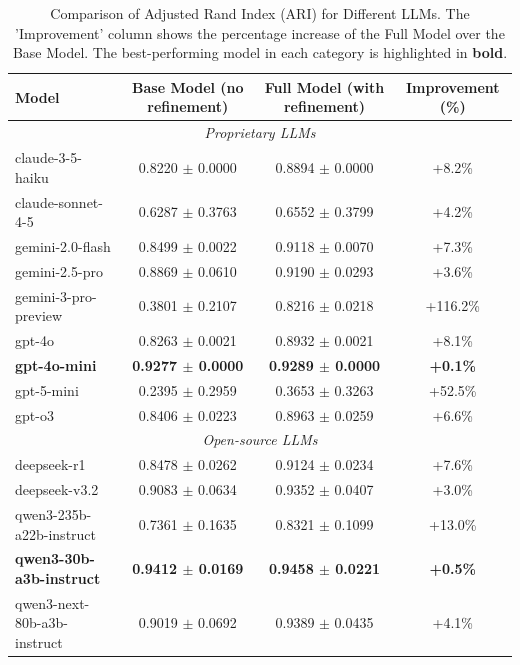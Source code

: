 
\begin{table}[htbp]
\centering
\caption{Comparison of Adjusted Rand Index (ARI) for Different LLMs. The 'Improvement' column shows the percentage increase of the Full Model over the Base Model. The best-performing model in each category is highlighted in \textbf{bold}.}
\label{tab:ari_comparison_enhanced}
\begin{tabular}{lccc}
\toprule
\textbf{Model} & \textbf{Base Model (no refinement)} & \textbf{Full Model (with refinement)} & \textbf{Improvement (\%)} \\
\midrule
\multicolumn{4}{c}{\textit{Proprietary LLMs}} \\
\midrule
claude-3-5-haiku & 0.8220 $\pm$ 0.0000 & 0.8894 $\pm$ 0.0000 & +8.2\% \\
claude-sonnet-4-5 & 0.6287 $\pm$ 0.3763 & 0.6552 $\pm$ 0.3799 & +4.2\% \\
gemini-2.0-flash & 0.8499 $\pm$ 0.0022 & 0.9118 $\pm$ 0.0070 & +7.3\% \\
gemini-2.5-pro & 0.8869 $\pm$ 0.0610 & 0.9190 $\pm$ 0.0293 & +3.6\% \\
gemini-3-pro-preview & 0.3801 $\pm$ 0.2107 & 0.8216 $\pm$ 0.0218 & +116.2\% \\
gpt-4o & 0.8263 $\pm$ 0.0021 & 0.8932 $\pm$ 0.0021 & +8.1\% \\
\textbf{gpt-4o-mini} & \textbf{0.9277 $\pm$ 0.0000} & \textbf{0.9289 $\pm$ 0.0000} & \textbf{+0.1\%} \\
gpt-5-mini & 0.2395 $\pm$ 0.2959 & 0.3653 $\pm$ 0.3263 & +52.5\% \\
gpt-o3 & 0.8406 $\pm$ 0.0223 & 0.8963 $\pm$ 0.0259 & +6.6\% \\
\midrule
\multicolumn{4}{c}{\textit{Open-source LLMs}} \\
\midrule
deepseek-r1 & 0.8478 $\pm$ 0.0262 & 0.9124 $\pm$ 0.0234 & +7.6\% \\
deepseek-v3.2 & 0.9083 $\pm$ 0.0634 & 0.9352 $\pm$ 0.0407 & +3.0\% \\
qwen3-235b-a22b-instruct & 0.7361 $\pm$ 0.1635 & 0.8321 $\pm$ 0.1099 & +13.0\% \\
\textbf{qwen3-30b-a3b-instruct} & \textbf{0.9412 $\pm$ 0.0169} & \textbf{0.9458 $\pm$ 0.0221} & \textbf{+0.5\%} \\
qwen3-next-80b-a3b-instruct & 0.9019 $\pm$ 0.0692 & 0.9389 $\pm$ 0.0435 & +4.1\% \\
\bottomrule
\end{tabular}
\end{table}
